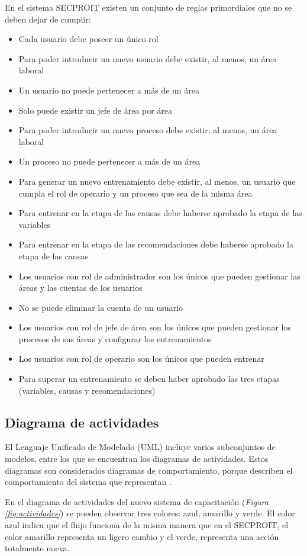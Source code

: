 En el sistema SECPROIT existen un conjunto de reglas primordiales que no se deben dejar de cumplir:
\begin{itemize}
\item Cada usuario debe poseer un único rol
\item Para poder introducir un nuevo usuario debe existir, al menos, un área laboral
\item Un usuario no puede pertenecer a más de un área
\item Solo puede existir un jefe de área por área
\item Para poder introducir un nuevo proceso debe existir, al menos, un área laboral
\item Un proceso no puede pertenecer a más de un área
\item Para generar un nuevo entrenamiento debe existir, al menos, un usuario que cumpla el rol de operario y un proceso que sea de la misma área
\item Para entrenar en la etapa de las causas debe haberse aprobado la etapa de las variables
\item Para entrenar en la etapa de las recomendaciones debe haberse aprobado la etapa de las causas
\item Los usuarios con rol de administrador son los únicos que pueden gestionar las áreas y las cuentas de los usuarios
\item No se puede eliminar la cuenta de un usuario
\item Los usuarios con rol de jefe de área son los únicos que pueden gestionar los procesos de sus áreas y configurar los entrenamientos
\item Los usuarios con rol de operario son los únicos que pueden entrenar
\item Para superar un entrenamiento se deben haber aprobado las tres etapas (variables, causas y recomendaciones)
\end{itemize}

\subsection{Diagrama de actividades}
El Lenguaje Unificado de Modelado (UML) incluye varios subconjuntos de modelos, entre los que se encuentran los diagramas de actividades. Estos diagramas son considerados diagramas de comportamiento, porque describen el comportamiento del sistema que representan \cite{Eriksson2000}.

En el diagrama de actividades del nuevo sistema de capacitación (\textsl{Figura \ref{fig:actividades}}) se pueden observar tres colores: azul, amarillo y verde. El color azul indica que el flujo funciona de la misma manera que en el SECPROIT, el color amarillo representa un ligero cambio y el verde, representa una acción totalmente nueva.

